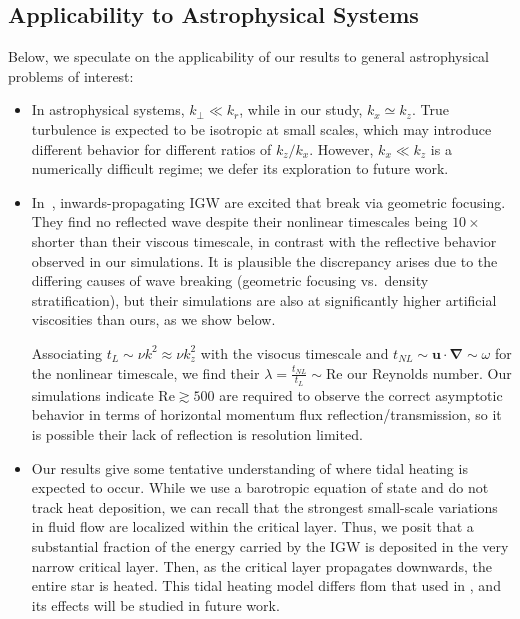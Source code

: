 \documentclass[
        fleqn,
        usenatbib,
        referee,
    ]{mnras}
\newcommand*{\bm}[1]{\mathbf{#1}}
\begin{document}
\subsection{Applicability to Astrophysical Systems}\label{ss:other}

Below, we speculate on the applicability of our results to general astrophysical
problems of interest:
\begin{itemize}
    \item In astrophysical systems, $k_{\perp} \ll k_r$, while in our study,
        $k_x \simeq k_z$. True turbulence is expected to be isotropic at small
        scales, which may introduce different behavior for different ratios of
        $k_z/k_x$. However, $k_x \ll k_z$ is a numerically difficult regime; we
        defer its exploration to future work.

    \item In~\cite{barker_ogilvie}, inwards-propagating IGW are excited that
        break via geometric focusing. They find no reflected wave despite their
        nonlinear timescales being $10\times$ shorter than their viscous
        timescale, in contrast with the reflective behavior observed in our
        simulations. It is plausible the discrepancy arises due to the differing
        causes of wave breaking (geometric focusing vs.\ density
        stratification), but their simulations are also at significantly higher
        artificial viscosities than ours, as we show below.

        Associating $t_{L} \sim \nu k^2 \approx \nu k_z^2$ with the visocus
        timescale and $t_{NL} \sim \bm{u} \cdot \bm{\nabla} \sim \omega$ for the
        nonlinear timescale, we find their $\lambda = \frac{t_{NL}}{t_L} \sim
        \mathrm{Re}$ our Reynolds number. Our simulations indicate $\mathrm{Re}
        \gtrsim 500$ are required to observe the correct asymptotic behavior in
        terms of horizontal momentum flux reflection/transmission, so it is
        possible their lack of reflection is resolution limited.

    \item Our results give some tentative understanding of where tidal heating
        is expected to occur. While we use a barotropic equation of state and do
        not track heat deposition, we can recall that the strongest small-scale
        variations in fluid flow are localized within the critical layer. Thus,
        we posit that a substantial fraction of the energy carried by the IGW is
        deposited in the very narrow critical layer. Then, as the critical layer
        propagates downwards, the entire star is heated. This tidal heating
        model differs flom that used in \citep{tidal_novae}, and its effects
        will be studied in future work.
\end{itemize}
\end{document}
